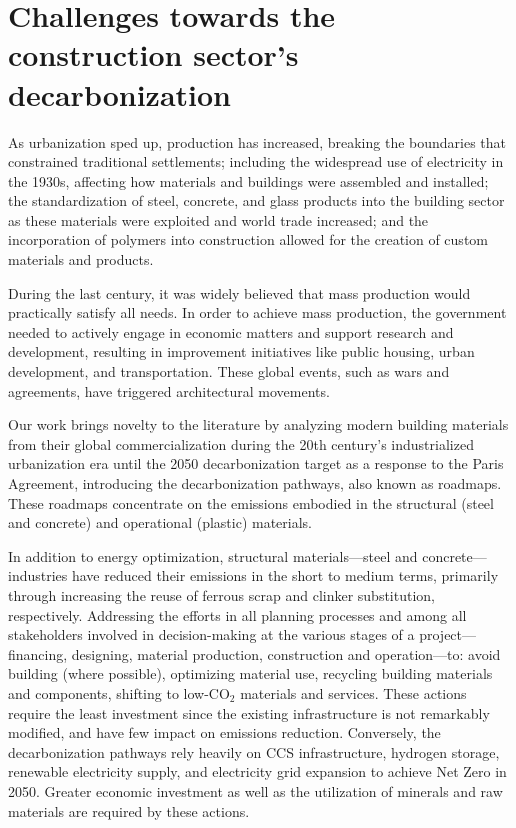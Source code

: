 \section{Challenges towards the construction sector’s decarbonization}
\label{sec:discussion_sec}

As urbanization sped up, production has increased, breaking the boundaries that constrained traditional settlements; including the widespread use of electricity in the 1930s, affecting how materials and buildings were assembled and installed; the standardization of steel, concrete, and glass products into the building sector as these materials were exploited and world trade increased; and the incorporation of polymers into construction allowed for the creation of custom materials and products. 

During the last century, it was widely believed that mass production would practically satisfy all needs. In order to achieve mass production, the government needed to actively engage in economic matters and support research and development, resulting in improvement initiatives like public housing, urban development, and transportation\autocite{harwood1969emergence}. These global events, such as wars and agreements, have triggered architectural movements.

Our work brings novelty to the literature by analyzing modern building materials from their global commercialization during the 20th century's industrialized urbanization era until the 2050 decarbonization target as a response to the Paris Agreement, introducing the decarbonization pathways, also known as roadmaps. These roadmaps concentrate on the emissions embodied in the structural (steel and concrete) and operational (plastic) materials. 

In addition to energy optimization, structural materials—steel and concrete—industries have reduced their emissions in the short to medium terms, primarily through increasing the reuse of ferrous scrap and clinker substitution, respectively. Addressing the efforts in all planning processes and among all stakeholders involved in decision-making at the various stages of a project—financing, designing, material production, construction and operation—to: avoid building (where possible), optimizing material use, recycling building materials and components, shifting to low-CO$_2$ materials and services. These actions require the least investment since the existing infrastructure is not remarkably modified, and have few impact on emissions reduction. Conversely, the decarbonization pathways rely heavily on CCS infrastructure, hydrogen storage, renewable electricity supply, and electricity grid expansion to achieve Net Zero in 2050. Greater economic investment as well as the utilization of minerals and raw materials are required by these actions.

